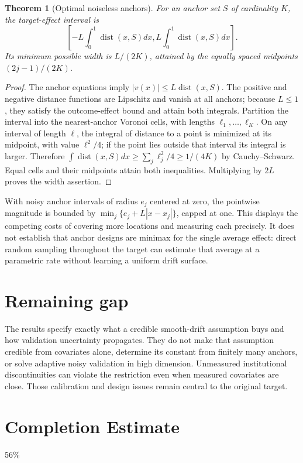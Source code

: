 \documentclass[11pt]{article}
\newtheorem{theorem}{Theorem}
\theoremstyle{remark}
\begin{document}
\begin{theorem}[Optimal noiseless anchors]
For an anchor set $S$ of cardinality $K$, the target-effect interval is
\[
 [-L\int_0^1\operatorname{dist}(x,S)dx,
   L\int_0^1\operatorname{dist}(x,S)dx].
\]
Its minimum possible width is $L/(2K)$, attained by the equally spaced midpoints $(2j-1)/(2K)$.
\end{theorem}
\begin{proof}
The anchor equations imply $|v(x)|\le L\operatorname{dist}(x,S)$. The positive and negative distance functions are Lipschitz and vanish at all anchors; because $L\le1$, they satisfy the outcome-effect bound and attain both integrals.
Partition the interval into the nearest-anchor Voronoi cells, with lengths $\ell_1,\ldots,\ell_K$. On any interval of length $\ell$, the integral of distance to a point is minimized at its midpoint, with value $\ell^2/4$; if the point lies outside that interval its integral is larger. Therefore
$\int\operatorname{dist}(x,S)dx\ge\sum_j\ell_j^2/4\ge1/(4K)$
by Cauchy--Schwarz. Equal cells and their midpoints attain both inequalities. Multiplying by $2L$ proves the width assertion.
\end{proof}
With noisy anchor intervals of radius $e_j$ centered at zero, the pointwise magnitude is bounded by $\min_j\{e_j+L|x-x_j|\}$, capped at one. This displays the competing costs of covering more locations and measuring each precisely. It does not establish that anchor designs are minimax for the single average effect: direct random sampling throughout the target can estimate that average at a parametric rate without learning a uniform drift surface.

\section*{Remaining gap}
The results specify exactly what a credible smooth-drift assumption buys and how validation uncertainty propagates. They do not make that assumption credible from covariates alone, determine its constant from finitely many anchors, or solve adaptive noisy validation in high dimension. Unmeasured institutional discontinuities can violate the restriction even when measured covariates are close. Those calibration and design issues remain central to the original target.

\section{Completion Estimate}
56\%
\end{document}
